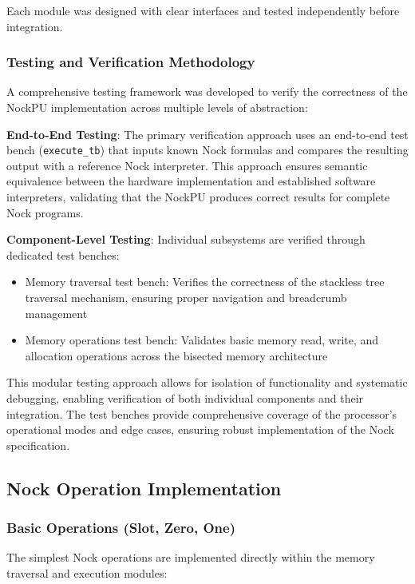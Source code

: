 \documentclass[twoside]{article}
\begin{document}
\noindent
Each module was designed with clear interfaces and tested independently before integration.

\subsubsection{Testing and Verification Methodology}

A comprehensive testing framework was developed to verify the correctness of the NockPU implementation across multiple levels of abstraction:

\textbf{End-to-End Testing}: The primary verification approach uses an end-to-end test bench (\texttt{execute\_tb}) that inputs known Nock formulas and compares the resulting output with a reference Nock interpreter. This approach ensures semantic equivalence between the hardware implementation and established software interpreters, validating that the NockPU produces correct results for complete Nock programs.

\textbf{Component-Level Testing}: Individual subsystems are verified through dedicated test benches:
\begin{itemize}
  \item Memory traversal test bench: Verifies the correctness of the stackless tree traversal mechanism, ensuring proper navigation and breadcrumb management
  \item Memory operations test bench: Validates basic memory read, write, and allocation operations across the bisected memory architecture
\end{itemize}

\noindent
This modular testing approach allows for isolation of functionality and systematic debugging, enabling verification of both individual components and their integration. The test benches provide comprehensive coverage of the processor's operational modes and edge cases, ensuring robust implementation of the Nock specification.

\subsection{Nock Operation Implementation}

\subsubsection{Basic Operations (Slot, Zero, One)}

The simplest Nock operations are implemented directly within the memory traversal and execution modules:
\end{document}
